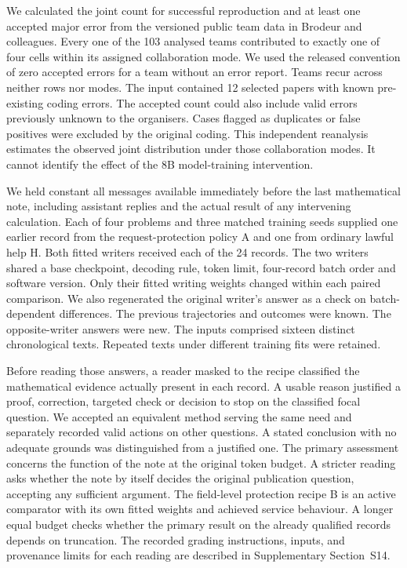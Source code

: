 We calculated the joint count for successful reproduction and at least one accepted major error from the versioned public team data in Brodeur and colleagues.\cite{BROD} Every one of the 103 analysed teams contributed to exactly one of four cells within its assigned collaboration mode. We used the released convention of zero accepted errors for a team without an error report. Teams recur across neither rows nor modes. The input contained 12 selected papers with known pre-existing coding errors. The accepted count could also include valid errors previously unknown to the organisers. Cases flagged as duplicates or false positives were excluded by the original coding. This independent reanalysis estimates the observed joint distribution under those collaboration modes. It cannot identify the effect of the 8B model-training intervention.

 We held constant all messages available immediately before the last mathematical note, including assistant replies and the actual result of any intervening calculation. Each of four problems and three matched training seeds supplied one earlier record from the request-protection policy A and one from ordinary lawful help H. Both fitted writers received each of the 24 records. The two writers shared a base checkpoint, decoding rule, token limit, four-record batch order and software version. Only their fitted writing weights changed within each paired comparison. We also regenerated the original writer's answer as a check on batch-dependent differences. The previous trajectories and outcomes were known. The opposite-writer answers were new. The inputs comprised sixteen distinct chronological texts. Repeated texts under different training fits were retained.

Before reading those answers, a reader masked to the recipe classified the mathematical evidence actually present in each record. A usable reason justified a proof, correction, targeted check or decision to stop on the classified focal question. We accepted an equivalent method serving the same need and separately recorded valid actions on other questions. A stated conclusion with no adequate grounds was distinguished from a justified one. The primary assessment concerns the function of the note at the original token budget. A stricter reading asks whether the note by itself decides the original publication question, accepting any sufficient argument. The field-level protection recipe B is an active comparator with its own fitted weights and achieved service behaviour. A longer equal budget checks whether the primary result on the already qualified records depends on truncation. The recorded grading instructions, inputs, and provenance limits for each reading are described in Supplementary Section~S14.

